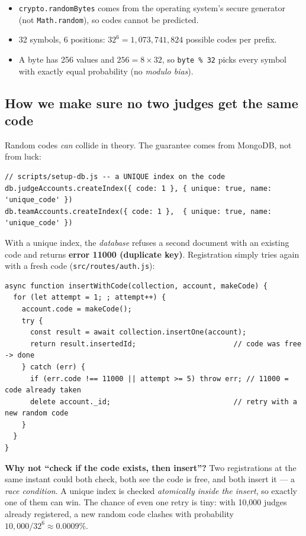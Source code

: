 \documentclass[11pt,a4paper]{article}
\begin{document}
\begin{itemize}[leftmargin=1.4em]
  \item \texttt{crypto.randomBytes} comes from the operating system's secure generator (not \texttt{Math.random}),
        so codes cannot be predicted.
  \item 32 symbols, 6 positions: $32^6 = 1{,}073{,}741{,}824$ possible codes per prefix.
  \item A byte has 256 values and $256 = 8 \times 32$, so \texttt{byte \% 32} picks every symbol with exactly equal
        probability (no \emph{modulo bias}).
\end{itemize}

\subsection{How we make sure no two judges get the same code}
Random codes \emph{can} collide in theory. The guarantee comes from MongoDB, not from luck:

\begin{lstlisting}
// scripts/setup-db.js -- a UNIQUE index on the code
db.judgeAccounts.createIndex({ code: 1 }, { unique: true, name: 'unique_code' })
db.teamAccounts.createIndex({ code: 1 },  { unique: true, name: 'unique_code' })
\end{lstlisting}

With a unique index, the \emph{database} refuses a second document with an existing code and returns
\textbf{error 11000 (duplicate key)}. Registration simply tries again with a fresh code (\texttt{src/routes/auth.js}):

\begin{lstlisting}
async function insertWithCode(collection, account, makeCode) {
  for (let attempt = 1; ; attempt++) {
    account.code = makeCode();
    try {
      const result = await collection.insertOne(account);
      return result.insertedId;                       // code was free -> done
    } catch (err) {
      if (err.code !== 11000 || attempt >= 5) throw err; // 11000 = code already taken
      delete account._id;                             // retry with a new random code
    }
  }
}
\end{lstlisting}

\begin{keyidea}
\textbf{Why not ``check if the code exists, then insert''?} Two registrations at the same instant could both check,
both see the code is free, and both insert it --- a \emph{race condition}. A unique index is checked \emph{atomically
inside the insert}, so exactly one of them can win. The chance of even one retry is tiny: with 10{,}000 judges already
registered, a new random code clashes with probability $10{,}000 / 32^6 \approx 0.0009\%$.
\end{keyidea}
\end{document}
